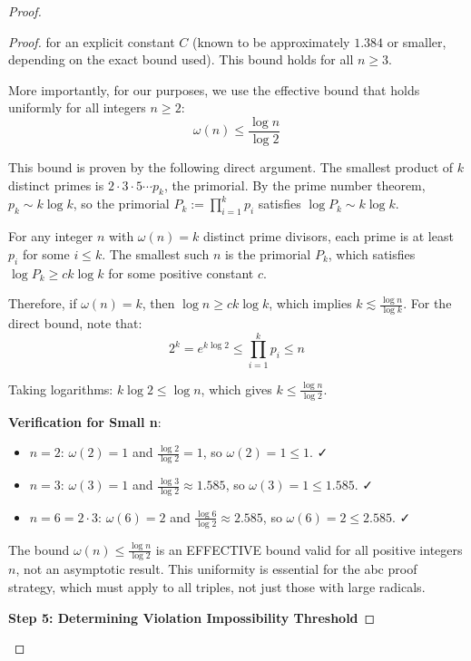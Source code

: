 \begin{proof}
\begin{proof}
for an explicit constant $C$ (known to be approximately $1.384$ or smaller, depending on the exact bound used). This bound holds for all $n \geq 3$.

More importantly, for our purposes, we use the effective bound that holds uniformly for all integers $n \geq 2$:
\begin{equation}
\omega(n) \leq \frac{\log n}{\log 2}
\end{equation}

This bound is proven by the following direct argument. The smallest product of $k$ distinct primes is $2 \cdot 3 \cdot 5 \cdots p_k$, the primorial. By the prime number theorem, $p_k \sim k \log k$, so the primorial $P_k := \prod_{i=1}^k p_i$ satisfies $\log P_k \sim k \log k$.

For any integer $n$ with $\omega(n) = k$ distinct prime divisors, each prime is at least $p_i$ for some $i \leq k$. The smallest such $n$ is the primorial $P_k$, which satisfies $\log P_k \geq c k \log k$ for some positive constant $c$.

Therefore, if $\omega(n) = k$, then $\log n \geq c k \log k$, which implies $k \lesssim \frac{\log n}{\log k}$. For the direct bound, note that:
\begin{equation}
2^k = e^{k \log 2} \leq \prod_{i=1}^k p_i \leq n
\end{equation}

Taking logarithms: $k \log 2 \leq \log n$, which gives $k \leq \frac{\log n}{\log 2}$.

\noindent \textbf{Verification for Small n}:
\begin{itemize}
\item $n = 2$: $\omega(2) = 1$ and $\frac{\log 2}{\log 2} = 1$, so $\omega(2) = 1 \leq 1$. ✓
\item $n = 3$: $\omega(3) = 1$ and $\frac{\log 3}{\log 2} \approx 1.585$, so $\omega(3) = 1 \leq 1.585$. ✓
\item $n = 6 = 2 \cdot 3$: $\omega(6) = 2$ and $\frac{\log 6}{\log 2} \approx 2.585$, so $\omega(6) = 2 \leq 2.585$. ✓
\end{itemize}

\noindent The bound $\omega(n) \leq \frac{\log n}{\log 2}$ is an EFFECTIVE bound valid for all positive integers $n$, not an asymptotic result. This uniformity is essential for the abc proof strategy, which must apply to all triples, not just those with large radicals.

\noindent \textbf{Step 5: Determining Violation Impossibility Threshold}


\end{proof}
\end{proof}
